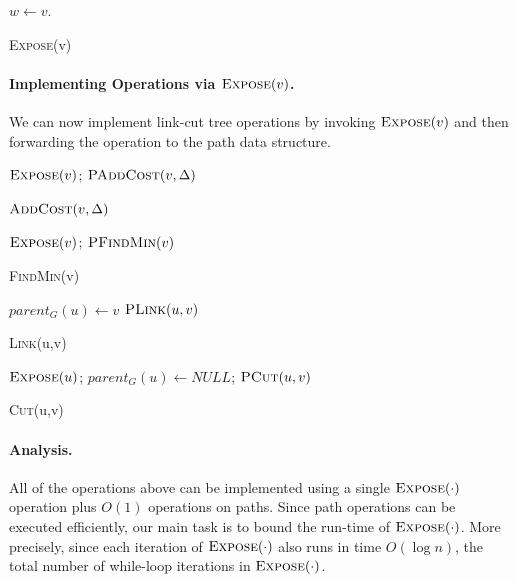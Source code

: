 \begin{algorithm}
  \SetAlgoLined
  $w \gets v$.\\
  \caption{\textsc{Expose}(v)}
\end{algorithm}

\paragraph{Implementing Operations via $\textsc{Expose}(v)$.} We can now implement link-cut tree operations by invoking $\textsc{Expose}(v)$ and then forwarding the operation to the path data structure. 
\begin{algorithm}[H]
  \SetAlgoLined
  $\textsc{Expose}(v)$; $\textsc{PAddCost}(v, \Delta)$
  \caption{$\textsc{AddCost}(v, \Delta)$}
\end{algorithm}
\begin{algorithm}[H]
  \SetAlgoLined
  $\textsc{Expose}(v)$; \Return $\textsc{PFindMin}(v)$
  \caption{\textsc{FindMin}(v)}
\end{algorithm}
\begin{algorithm}[H]
  \SetAlgoLined
  $parent_G(u) \gets v$\;
  $\textsc{PLink}(u,v)$
  \caption{\textsc{Link}(u,v)}
\end{algorithm}
\begin{algorithm}[H]
  \SetAlgoLined
  $\textsc{Expose}(u)$; $parent_G(u) \gets NULL$; $\textsc{PCut}(u,v)$\;
  \caption{\textsc{Cut}(u,v)}
\end{algorithm}

\paragraph{Analysis.} All of the operations above can be implemented using a single $\textsc{Expose}(\cdot)$ operation plus $O(1)$ operations on paths. Since path operations can be executed efficiently, our main task is to bound the run-time of $\textsc{Expose}(\cdot)$. More precisely, since each iteration of $\textsc{Expose}(\cdot)$ also runs in time $O(\log n)$, the total number of while-loop iterations in $\textsc{Expose}(\cdot)$.


